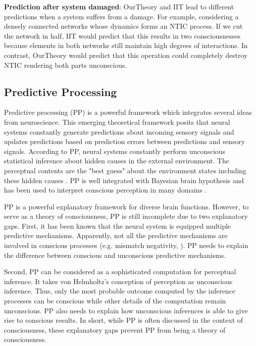 \documentclass[utf8]{article}
\begin{document}
		    \textbf{Prediction after system damaged}: \ac{OurTheory} and IIT lead to different predictions when a system suffers from a damage. For example, considering a densely connected networks whose dynamics forms an NTIC process. If we cut the network in half, IIT would predict that this results in two consciousnesses because elements in both networks still maintain high degrees of interactions. In contrast, \ac{OurTheory} would predict that this operation could completely destroy NTIC rendering both parts unconscious.
		    

		\subsection{Predictive Processing}
    		Predictive processing (PP) is a powerful framework which integrates several ideas from neuroscience. This emerging theoretical framework posits that neural systems constantly generate predictions about incoming sensory signals and updates predictions based on prediction errors between predictions and sensory signals. According to PP, neural systems constantly perform unconscious statistical inference about hidden causes in the external environment. The perceptual contents are the "best guess" about the environment states including these hidden causes \citep{clark_2013, Hohwy2013}. PP is well integrated with Bayesian brain hypothesis and has been used to interpret conscious perception in many domains \citep{Hohwy2013, seth2014predictive}.
    		
    		PP is a powerful explanatory framework for diverse brain functions. However, to serve as a theory of consciousness, PP is still incomplete due to two explanatory gaps. First, it has been known that the neural system is equipped multiple predictive mechanisms. Apparently, not all the predictive mechanisms are involved in conscious processes (e.g. mismatch negativity, \cite{naatanen2007mismatch}). PP needs to explain the difference between conscious and unconscious predictive mechanisms. 
    		
    		Second, PP can be considered as a sophisticated computation for perceptual inference. It takes von Helmholtz's conception of perception as unconscious inference. Thus, only the most probable outcome computed by the inference processes can be conscious while other details of the computation remain unconscious. PP also needs to explain how unconscious inferences is able to give rise to conscious results. In short, while PP is often discussed in the context of consciousness, these explanatory gaps prevent PP from being a theory of consciousness. 
    		
\end{document}
